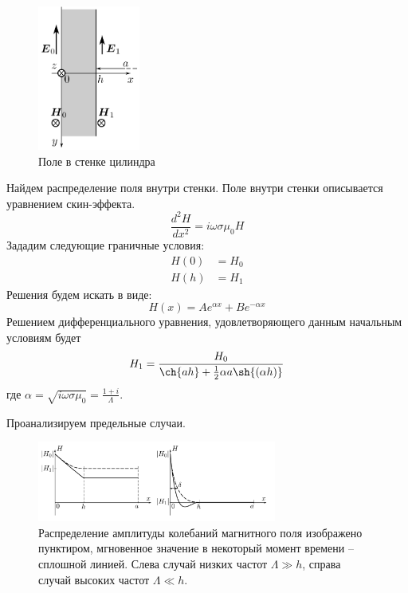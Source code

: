 \begin{figure}
	\vspace{-10pt}
	\centering
	\includegraphics[width=0.3\textwidth]{../res/wall.png}
	\caption{Поле в стенке цилиндра}
	\label{fig:wall}
\end{figure}

Найдем распределение поля внутри стенки. Поле внутри стенки описывается уравнением скин-эффекта. 
$$
\frac{d^2 H}{dx^2} = i \omega \sigma \mu_0 H
$$
Зададим следующие граничные условия: 
\begin{equation*}
	\begin{split}
		H(0) &= H_0 \\
		H(h) &= H_1
	\end{split}
\end{equation*}
Решения будем искать в виде:
$$
H(x) = A e^{\alpha x} + B e^{-\alpha x}
$$
Решением дифференциального уравнения, удовлетворяющего данным начальным условиям будет
$$
H_1 = \frac{H_0}{\ch{ah} + \frac{1}{2} \alpha a \sh{\left( \alpha h \right)}}
$$
где $\alpha = \sqrt{i \omega \sigma \mu_0} = \frac{1 + i}{\Lambda}$.

Проанализируем предельные случаи.

\begin{figure}[H]
	\centering
	\includegraphics[width=0.7\textwidth]{../res/graphs.png}
	\caption{Распределение амплитуды колебаний магнитного поля изображено пунктиром, мгновенное значение в некоторый момент времени -- сплошной линией. Слева случай низких частот $\Lambda \gg h$, справа случай высоких частот $\Lambda \ll h$.}
	\label{fig:emi}
\end{figure}

